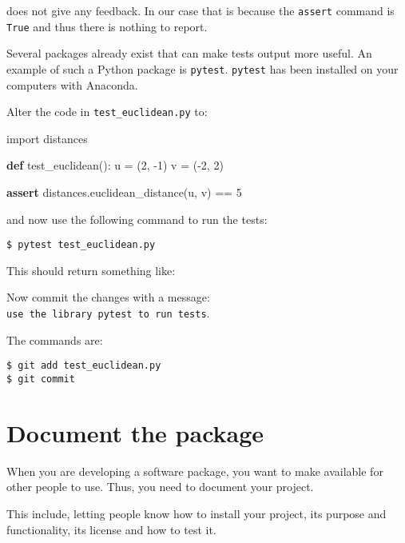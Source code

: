 \documentclass[11pt]{article}
\newenvironment{Shaded}{}{}
\newcommand{\KeywordTok}[1]{\textcolor[rgb]{0.00,0.44,0.13}{\textbf{{#1}}}}
\newcommand{\DecValTok}[1]{\textcolor[rgb]{0.25,0.63,0.44}{{#1}}}
\newcommand{\NormalTok}[1]{{#1}}
\newcommand{\ImportTok}[1]{{#1}}
\newcommand{\ControlFlowTok}[1]{\textcolor[rgb]{0.00,0.44,0.13}{\textbf{{#1}}}}
\newcommand{\OperatorTok}[1]{\textcolor[rgb]{0.40,0.40,0.40}{{#1}}}
\begin{document}
does not give any feedback. In our case that is because the
\texttt{assert} command is \texttt{True} and thus there is nothing to
report.

Several packages already exist that can make tests output more useful.
An example of such a Python package is \texttt{pytest}. \texttt{pytest}
has been installed on your computers with Anaconda.

Alter the code in \texttt{test\_euclidean.py} to:

\begin{Shaded}
\begin{Highlighting}[]
\ImportTok{import}\NormalTok{ distances}

\KeywordTok{def}\NormalTok{ test\_euclidean():}
\NormalTok{    u }\OperatorTok{=}\NormalTok{ (}\DecValTok{2}\NormalTok{, }\OperatorTok{{-}}\DecValTok{1}\NormalTok{)}
\NormalTok{    v }\OperatorTok{=}\NormalTok{ (}\OperatorTok{{-}}\DecValTok{2}\NormalTok{, }\DecValTok{2}\NormalTok{)}

    \ControlFlowTok{assert}\NormalTok{ distances.euclidean\_distance(u, v) }\OperatorTok{==} \DecValTok{5}
\end{Highlighting}
\end{Shaded}

and now use the following command to run the tests:

\begin{verbatim}
$ pytest test_euclidean.py
\end{verbatim}

This should return something like:

Now commit the changes with a message:
\texttt{use\ the\ library\ pytest\ to\ run\ tests}.

The commands are:

\begin{verbatim}
$ git add test_euclidean.py
$ git commit
\end{verbatim}

    \hypertarget{document-the-package}{%
\section{Document the package}\label{document-the-package}}

When you are developing a software package, you want to make available
for other people to use. Thus, you need to document your project.

This include, letting people know how to install your project, its
purpose and functionality, its license and how to test it.
\end{document}

